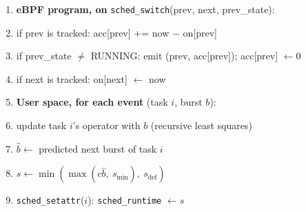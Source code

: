 \documentclass{article}
\begin{document}
\begin{enumerate}
\item \textbf{eBPF program, on} \texttt{sched\_switch}(prev, next, prev\_state):
\item \hspace{1em}if prev is tracked: acc[prev] += now − on[prev]
\item \hspace{1em}\hspace{1em}if prev\_state $\neq$ RUNNING: emit (prev, acc[prev]); acc[prev] $\leftarrow 0$
\item \hspace{1em}if next is tracked: on[next] $\leftarrow$ now
\item \textbf{User space, for each event} (task $i$, burst $b$):
\item \hspace{1em}update task $i$'s operator with $b$ (recursive least squares)
\item \hspace{1em}$\hat b \leftarrow$ predicted next burst of task $i$
\item \hspace{1em}$s \leftarrow \min(\max(c\hat b,\ s_{\min}),\ s_{\text{def}})$
\item \hspace{1em}\texttt{sched\_setattr}($i$): \texttt{sched\_runtime} $\leftarrow s$
\end{enumerate}
\end{document}
